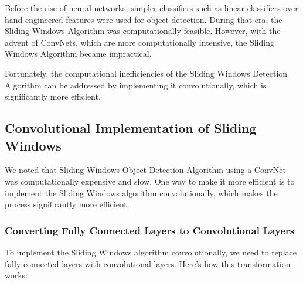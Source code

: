 \documentclass[letterpaper,12pt,notitlepage,twoside]{report}
\begin{document}
Before the rise of neural networks, simpler classifiers such as linear classifiers over hand-engineered features were used for object detection. During that era, the Sliding Windows Algorithm was computationally feasible. However, with the advent of ConvNets, which are more computationally intensive, the Sliding Windows Algorithm became impractical.

Fortunately, the computational inefficiencies of the Sliding Windows Detection Algorithm can be addressed by implementing it convolutionally, which is significantly more efficient. 

\subsection{Convolutional Implementation of Sliding Windows}
We noted that Sliding Windows Object Detection Algorithm using a ConvNet was computationally expensive and slow. One way to make it more efficient is to implement the Sliding Windows algorithm convolutionally, which makes the process significantly more efficient.

\subsubsection*{Converting Fully Connected Layers to Convolutional Layers}

To implement the Sliding Windows algorithm convolutionally, we need to replace fully connected layers with convolutional layers. Here's how this transformation works:
\end{document}
